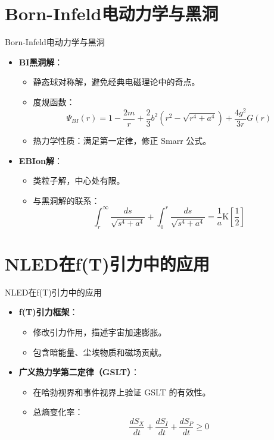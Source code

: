 \documentclass{beamer}
\begin{document}
\section{Born-Infeld电动力学与黑洞}
\begin{frame}{Born-Infeld电动力学与黑洞}
\begin{itemize}
    \item \textbf{BI黑洞解}：
    \begin{itemize}
        \item 静态球对称解，避免经典电磁理论中的奇点。
        \item 度规函数：
        \[
        \Psi_{BI}(r) = 1 - \frac{2m}{r} + \frac{2}{3}b^2\left(r^2 - \sqrt{r^4 + a^4}\right) + \frac{4g^2}{3r}G(r)
        \]
        \item 热力学性质：满足第一定律，修正 Smarr 公式。
    \end{itemize}
    \item \textbf{EBIon解}：
    \begin{itemize}
        \item 类粒子解，中心处有限。
        \item 与黑洞解的联系：
        \[
        \int_{r}^{\infty}\frac{ds}{\sqrt{s^4 + a^4}} + \int_{0}^{r}\frac{ds}{\sqrt{s^4 + a^4}} = \frac{1}{a}\text{K}\left[\frac{1}{2}\right]
        \]
    \end{itemize}
\end{itemize}
\end{frame}

\section{NLED在f(T)引力中的应用}
\begin{frame}{NLED在f(T)引力中的应用}
\begin{itemize}
    \item \textbf{f(T)引力框架}：
    \begin{itemize}
        \item 修改引力作用，描述宇宙加速膨胀。
        \item 包含暗能量、尘埃物质和磁场贡献。
    \end{itemize}
    \item \textbf{广义热力学第二定律（GSLT）}：
    \begin{itemize}
        \item 在哈勃视界和事件视界上验证 GSLT 的有效性。
        \item 总熵变化率：
        \[
        \frac{dS_X}{dt} + \frac{dS_I}{dt} + \frac{dS_P}{dt} \geq 0
        \]
    \end{itemize}
\end{itemize}
\end{frame}
\end{document}
